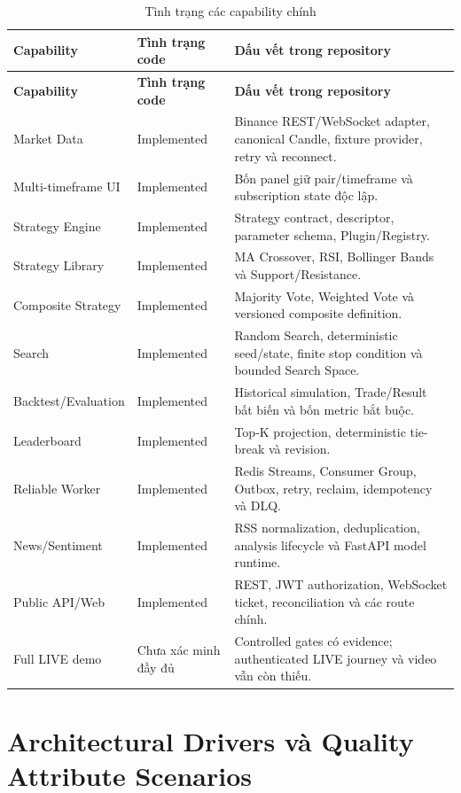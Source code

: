\documentclass[12pt,a4paper,oneside]{report}
\begin{document}
\begin{longtable}{L{3.2cm}L{2.7cm}L{8.4cm}}
  \caption{Tình trạng các capability chính}\label{tab:function-status}\\
  \toprule
  \textbf{Capability} & \textbf{Tình trạng code} & \textbf{Dấu vết trong repository} \\
  \midrule
  \endfirsthead
  \toprule
  \textbf{Capability} & \textbf{Tình trạng code} & \textbf{Dấu vết trong repository} \\
  \midrule
  \endhead
  Market Data & Implemented & Binance REST/WebSocket adapter, canonical Candle, fixture provider, retry và reconnect. \\
  Multi-timeframe UI & Implemented & Bốn panel giữ pair/timeframe và subscription state độc lập. \\
  Strategy Engine & Implemented & Strategy contract, descriptor, parameter schema, Plugin/Registry. \\
  Strategy Library & Implemented & MA Crossover, RSI, Bollinger Bands và Support/Resistance. \\
  Composite Strategy & Implemented & Majority Vote, Weighted Vote và versioned composite definition. \\
  Search & Implemented & Random Search, deterministic seed/state, finite stop condition và bounded Search Space. \\
  Backtest/Evaluation & Implemented & Historical simulation, Trade/Result bất biến và bốn metric bắt buộc. \\
  Leaderboard & Implemented & Top-K projection, deterministic tie-break và revision. \\
  Reliable Worker & Implemented & Redis Streams, Consumer Group, Outbox, retry, reclaim, idempotency và DLQ. \\
  News/Sentiment & Implemented & RSS normalization, deduplication, analysis lifecycle và FastAPI model runtime. \\
  Public API/Web & Implemented & REST, JWT authorization, WebSocket ticket, reconciliation và các route chính. \\
  Full LIVE demo & Chưa xác minh đầy đủ & Controlled gates có evidence; authenticated LIVE journey và video vẫn còn thiếu. \\
  \bottomrule
\end{longtable}

\chapter{Architectural Drivers và Quality Attribute Scenarios}
\label{chap:drivers}
\end{document}
